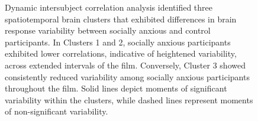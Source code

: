\begin{figure}[!ht]
	\centering
	\caption{Dynamic intersubject correlation analysis identified three spatiotemporal brain clusters that exhibited differences in brain response variability between socially anxious and control participants. In Clusters 1 and 2, socially anxious participants exhibited lower correlations, indicative of heightened variability, across extended intervals of the film. Conversely, Cluster 3 showed consistently reduced variability among socially anxious participants throughout the film. Solid lines depict moments of significant variability within the clusters, while dashed lines represent moments of non-significant variability.}
    \vspace*{-10pt}
	\label{fig:isc-fmri-time}
\end{figure}

